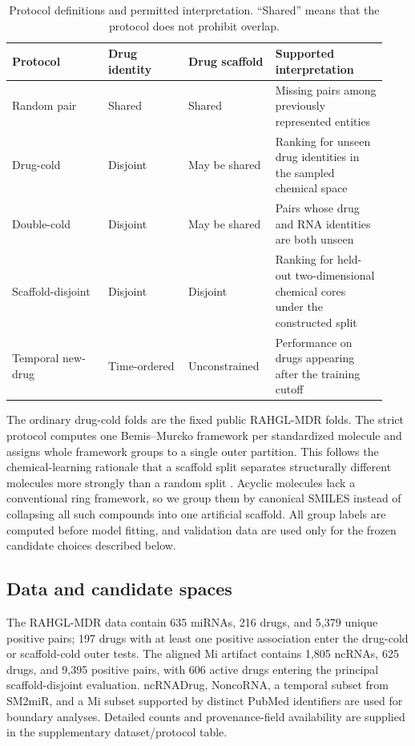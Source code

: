 \documentclass[10pt]{article}
\begin{document}
\begin{table}[htbp]
\centering
\caption{Protocol definitions and permitted interpretation. ``Shared'' means that the protocol does not prohibit overlap.}
\label{tab:protocols}
\small
\begin{tabular}{p{0.24\linewidth}p{0.20\linewidth}p{0.20\linewidth}p{0.29\linewidth}}
\toprule
Protocol & Drug identity & Drug scaffold & Supported interpretation \\
\midrule
Random pair & Shared & Shared & Missing pairs among previously represented entities \\
Drug-cold & Disjoint & May be shared & Ranking for unseen drug identities in the sampled chemical space \\
Double-cold & Disjoint & May be shared & Pairs whose drug and RNA identities are both unseen \\
Scaffold-disjoint & Disjoint & Disjoint & Ranking for held-out two-dimensional chemical cores under the constructed split \\
Temporal new-drug & Time-ordered & Unconstrained & Performance on drugs appearing after the training cutoff \\
\bottomrule
\end{tabular}
\end{table}

The ordinary drug-cold folds are the fixed public RAHGL-MDR folds. The strict protocol computes one Bemis--Murcko framework per standardized molecule and assigns whole framework groups to a single outer partition. This follows the chemical-learning rationale that a scaffold split separates structurally different molecules more strongly than a random split \citep{wu2018moleculenet}. Acyclic molecules lack a conventional ring framework, so we group them by canonical SMILES instead of collapsing all such compounds into one artificial scaffold. All group labels are computed before model fitting, and validation data are used only for the frozen candidate choices described below.

\subsection{Data and candidate spaces}

The RAHGL-MDR data contain 635 miRNAs, 216 drugs, and 5,379 unique positive pairs; 197 drugs with at least one positive association enter the drug-cold or scaffold-cold outer tests. The aligned Mi artifact contains 1,805 ncRNAs, 625 drugs, and 9,395 positive pairs, with 606 active drugs entering the principal scaffold-disjoint evaluation. ncRNADrug, NoncoRNA, a temporal subset from SM2miR, and a Mi subset supported by distinct PubMed identifiers are used for boundary analyses. Detailed counts and provenance-field availability are supplied in the supplementary dataset/protocol table.
\end{document}
